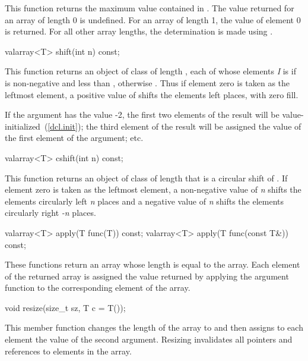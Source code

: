 \begin{itemdescr}
\pnum
This function returns the maximum value contained in
.
The value returned for an array of length 0 is undefined.
For an array
of length 1, the value of element 0 is returned.
For all other array
lengths, the determination is made using
.
\end{itemdescr}

%
\begin{itemdecl}
valarray<T> shift(int n) const;
\end{itemdecl}

\begin{itemdescr}
\pnum
This function returns an object of class
of length
,
each of whose elements
\textit{I}
is
if
is non-negative and less than
,
otherwise
.
Thus if element zero is taken as the leftmost element,
a positive value of  shifts the elements left 
places, with zero fill.

\pnum
\enterexample
If the argument has the value -2,
the first two elements of the result will be value-initialized~(\ref{dcl.init}); the third element of the result will be assigned the value
of the first element of the argument; etc.
\exitexample
{}%
\begin{itemdecl}
valarray<T> cshift(int n) const;
\end{itemdecl}

\pnum
This function returns an object of class
of length
that is a circular shift of . If element zero is taken as the leftmost element, a non-negative value of \emph{n} shifts the elements circularly left \emph{n} places and a negative value of \emph{n} shifts the elements circularly right \emph{-n} places.
\end{itemdescr}

%
\begin{itemdecl}
valarray<T> apply(T func(T)) const;
valarray<T> apply(T func(const T&)) const;
\end{itemdecl}

\begin{itemdescr}
\pnum
These functions return an array whose length is equal to the array.
Each element of the returned array is assigned
the value returned by applying the argument function to the
corresponding element of the array.

%
\begin{itemdecl}
void resize(size_t sz, T c = T());
\end{itemdecl}

\pnum
This member function changes the length of the
array to
and then assigns to each element the value of the second argument.
Resizing invalidates all pointers and references to elements in the array.
\end{itemdescr}

